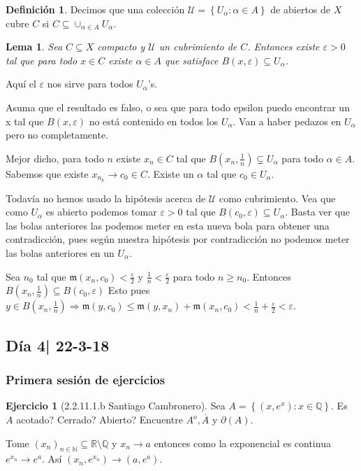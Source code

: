 \documentclass[12pt]{article}
\theoremstyle{plain}
\newtheorem{Lem}[Th]{Lema}             %
\theoremstyle{definition}
\newtheorem{Def}[Th]{Definición}       %
\newtheorem{Ej}[Th]{Ejercicio}
\theoremstyle{remark}
\numberwithin{equation}{section}
\newcommand{\bN}{\mathbb{N}}        %
\newcommand{\bQ}{\mathbb{Q}}        %
\newcommand{\bR}{\mathbb{R}}        %
\newcommand{\mm}{\mathfrak{m}}      %
\newcommand{\cU}{\mathcal{U}}       %
\renewcommand{\geq}{\geqslant}      %
\renewcommand{\leq}{\leqslant}      %
\renewcommand{\:}{\colon}           %
\newcommand{\conj}[1]{\left\lbrace#1\right\rbrace}
\begin{document}
\begin{multicols}{2}
\begin{Def}
  Decimos que una colección $\mathcal{U}=\conj{U_\alpha\colon \alpha\in A}$ de abiertos de $X$ cubre $C$ si $C\subseteq\cup_{\alpha\in A}U_\alpha$.
\end{Def}

\begin{Lem}
  Sea $C\subseteq X$ compacto y $\cU$ un cubrimiento de $C$. Entonces existe $\varepsilon >0$ tal que para todo $x\in C$ existe $\alpha\in A$ que satisface $B(x,\varepsilon)\subseteq U_\alpha$.
\end{Lem}
Aquí el $\varepsilon$ nos sirve para todos $U_\alpha$'s.
\begin{ptcbp}
Asuma que el resultado es falso, o sea que para todo epsilon puedo encontrar un x tal que $B(x,\varepsilon)$ no está contenido en todos los $U_\alpha$. Van a haber pedazos en $U_\alpha$ pero no completamente. \par
Mejor dicho, para todo $n$ existe $x_n\in C$ tal que $B(x_n,\frac{1}{n})\subsetneq U_\alpha$ para todo $\alpha\in A$. Sabemos que existe $x_{n_k}\to c_0\in C$. Existe un $\alpha$ tal que $c_0\in U_\alpha$.\par
Todavía no hemos usado la hipótesis acerca de $\cU$ como cubrimiento. Vea que como $U_\alpha$ es abierto podemos tomar $\varepsilon > 0$ tal que $B(c_0,\varepsilon)\subseteq U_\alpha$. Basta ver que las bolas anteriores las podemos meter en esta nueva bola para obtener una contradicción, pues según nuestra hipótesis por contradicción no podemos meter las bolas anteriores en un $U_\alpha$.\par
Sea $n_0$ tal que $\mm(x_n,c_0)<\frac{\varepsilon}{2}$ y $\frac{1}{n}<\frac{\varepsilon}{2}$ para todo $n\geq n_0$. Entonces $B(x_n,\frac{1}{n})\subseteq B(c_0,\varepsilon)$ Esto pues $y\in B(x_n,\frac{1}{n})\Rightarrow \mm(y,c_0)\leq \mm(y,x_n)+\mm(x_n,c_0)<\frac{1}{n}+\frac{\varepsilon}{2}<\varepsilon$.
\end{ptcbp}

\subsection{Día 4| 22-3-18}

\subsubsection*{Primera sesión de ejercicios}

\begin{Ej}[2.2.11.1.b Santiago Cambronero]
  Sea $A=\conj{(x,e^x)\colon x\in\bQ}$. Es $A$ acotado? Cerrado? Abierto? Encuentre $A^o, \overline{A}$ y $\partial(A)$.
\end{Ej}
\begin{ptcb}
Tome $(x_n)_{n\in\bN}\subseteq\bR\setminus\bQ$ y $x_n\to a$ entonces como la exponencial es continua $e^{x_n}\to e^a$. Así $(x_n,e^{x_n})\to (a,e^a)$.
\end{ptcb}


\end{multicols}
\end{document}

